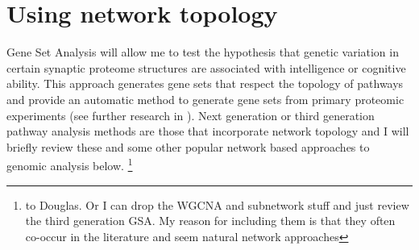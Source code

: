 
\section{Using network topology}
\label{sec: using network topology}

Gene Set Analysis will allow me to test the hypothesis that genetic variation in certain synaptic proteome structures are associated with intelligence or cognitive ability. This approach generates gene sets that respect the topology of pathways and provide an automatic method to generate gene sets from primary proteomic experiments (see further research in \cite{lamparter2016fast}). Next generation or third generation pathway analysis methods are those that incorporate network topology \cite{khatri2012ten}\cite{zyla2017ranking} and I will briefly review these and some other popular network based approaches to genomic analysis below. \footnote{to Douglas. Or I can drop the WGCNA and subnetwork stuff and just review the third generation GSA. My reason for including them is that they often co-occur in the literature and seem natural network approaches}

